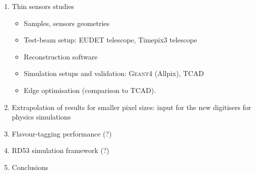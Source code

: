 \begin{enumerate}
\item Thin sensors studies
  \begin{itemize}
  \item Samples, sensors geometries
  \item Test-beam setup: EUDET telescope, Timepix3 telescope
  \item Reconstruction software
  \item Simulation setups and validation: \textsc{Geant4} (Allpix), TCAD 
  \item Edge optimisation (comparison to TCAD).
  \end{itemize}


\item Extrapolation of results for smaller pixel sizes: input for the
  new digitisers for physics simulations

\item Flavour-tagging performance (?)
\item RD53 simulation framework (?)
\item Conclusions
  
\end{enumerate}

